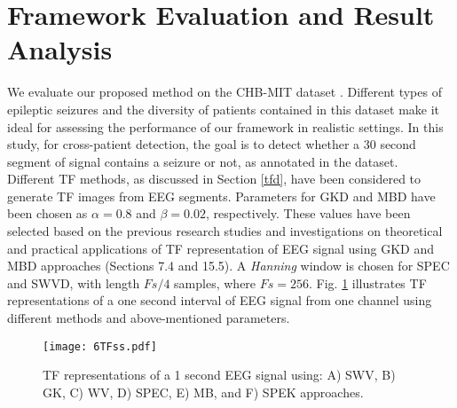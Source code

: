\documentclass{article}
\begin{document}
\section{Framework Evaluation and Result Analysis}
\vspace{-3mm}
We evaluate our proposed method on the  CHB-MIT dataset \cite{shoeb}. 
Different types of epileptic seizures and the diversity of patients contained in this dataset make it ideal for assessing the performance of our framework in realistic settings. In this study, for cross-patient detection,
the goal is to detect whether a 30 second segment of signal
contains a seizure or not, as annotated in the dataset.\\
\indent Different TF methods, 
as discussed in Section \ref{tfd},
 have been considered to generate TF images from EEG segments. Parameters for GKD and MBD have been chosen as $\alpha=0.8$ and $\beta=0.02$, respectively. These values have been selected based on the previous research studies and investigations on theoretical and practical applications of TF representation of EEG signal using GKD and MBD approaches \cite{BoualemB} (Sections 7.4 and 15.5). 
A \emph{Hanning} window is chosen for SPEC and SWVD, with length $Fs/4$ samples, 
where $Fs=256$. Fig. \ref{TFs} illustrates TF representations of a one second interval of EEG signal from one channel using different methods and above-mentioned parameters.
 \begin{figure} [h]
\centerline{\texttt{[image: 6TFss.pdf]}}
\vspace{-3mm}
\caption{TF representations of a 1 second EEG signal using: A) SWV, B) GK, C) WV, D) SPEC, E) MB, and F) SPEK approaches.
}
\vspace{-3mm}
\label{TFs}
\end{figure}
\end{document}
